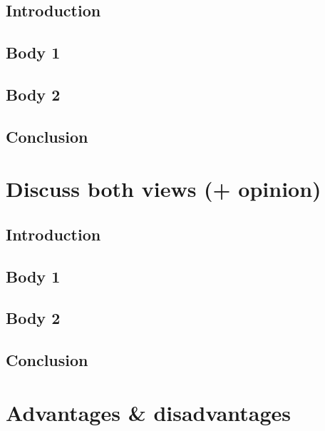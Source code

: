 \documentclass[11pt,a4paper]{article}
\begin{document}
\subsection*{Introduction}
\vspace{1cm}
\subsection*{Body 1}
\vspace{1cm}
\subsection*{Body 2}
\vspace{1cm}
\subsection*{Conclusion}
\vspace{1cm}
\clearpage
\section*{Discuss both views (+ opinion)}
\subsection*{Introduction}
\vspace{1cm}
\subsection*{Body 1}
\vspace{1cm}
\subsection*{Body 2}
\vspace{1cm}
\subsection*{Conclusion}
\vspace{1cm}
\clearpage
\section*{Advantages \& disadvantages}
\end{document}
